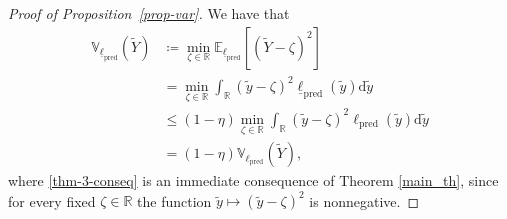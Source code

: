 \documentclass[12pt, english, oneside, a4paper]{article}
\begin{document}
\begin{proof}[Proof of Proposition~\ref{prop-var}]
    We have that
    \begin{align}
        \mathbb{V}_{\underline{\ell}_\text{pred}}(\tilde{Y}) &\coloneqq \min_{\zeta\in\mathbb{R}} \mathbb{E}_{\underline{\ell}_\text{pred}}[(\tilde{Y}-\zeta)^2] \nonumber \\
        &= \min_{\zeta\in\mathbb{R}} \int_\mathbb{R} (\tilde{y}-\zeta)^2 \underline{\ell}_\text{pred}(\tilde{y})\text{d}\tilde{y} \nonumber \\
        &\leq (1-\eta) \min_{\zeta\in\mathbb{R}} \int_\mathbb{R} (\tilde{y}-\zeta)^2 {\ell}_\text{pred}(\tilde{y})\text{d}\tilde{y} \label{thm-3-conseq}\\
        &= (1-\eta) \mathbb{V}_{{\ell}_\text{pred}}(\tilde{Y}), \nonumber
    \end{align}
    where \eqref{thm-3-conseq} is an immediate consequence of Theorem \ref{main_th}, since for every fixed $\zeta\in\mathbb R$ the function $\tilde y\mapsto (\tilde y-\zeta)^2$ is nonnegative.
\end{proof}
\end{document}
